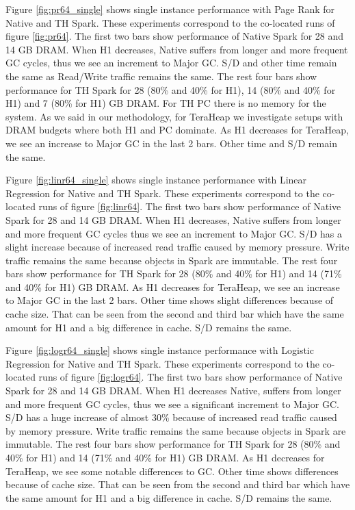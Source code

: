 Figure \ref{fig:pr64_single} shows single instance performance with Page Rank for Native and TH Spark. These experiments correspond to the co-located runs of figure \ref{fig:pr64}. The first two bars show performance of Native Spark for 28 and 14 GB DRAM. When H1 decreases, Native suffers from longer and more frequent GC cycles, thus we see an increment to Major GC. S/D and other time remain the same as Read/Write traffic remains the same. The rest four bars show performance for TH Spark for 28 (80\% and 40\% for H1), 14 (80\% and 40\% for H1) and 7 (80\% for H1) GB DRAM. For TH PC there is no memory for the system. As we said in our methodology, for TeraHeap we investigate setups with DRAM budgets where both H1 and PC dominate. As H1 decreases for TeraHeap, we see an increase to Major GC in the last 2 bars. Other time and S/D remain the same.

Figure \ref{fig:linr64_single} shows single instance performance with Linear Regression for Native and TH Spark. These experiments correspond to the co-located runs of figure \ref{fig:linr64}. The first two bars show performance of Native Spark for 28 and 14 GB DRAM. When H1 decreases, Native suffers from longer and more frequent GC cycles thus we see an increment to Major GC. S/D has a slight increase because of increased read traffic caused by memory pressure. Write traffic remains the same because objects in Spark are immutable. The rest four bars show performance for TH Spark for 28 (80\% and 40\% for H1) and 14 (71\% and 40\% for H1) GB DRAM. As H1 decreases for TeraHeap, we see an increase to Major GC in the last 2 bars. Other time shows slight differences because of cache size. That can be seen from the second and third bar which have the same amount for H1 and a big difference in cache. S/D remains the same.

Figure \ref{fig:logr64_single} shows single instance performance with Logistic Regression for Native and TH Spark. These experiments correspond to the co-located runs of figure \ref{fig:logr64}. The first two bars show performance of Native Spark for 28 and 14 GB DRAM. When H1 decreases Native, suffers from longer and more frequent GC cycles, thus we see a significant increment to Major GC. S/D has a huge increase of almost 30\% because of increased read traffic caused by memory pressure. Write traffic remains the same because objects in Spark are immutable. The rest four bars show performance for TH Spark for 28 (80\% and 40\% for H1) and 14 (71\% and 40\% for H1) GB DRAM. As H1 decreases for TeraHeap, we see some notable differences to GC. Other time shows differences because of cache size. That can be seen from the second and third bar which have the same amount for H1 and a big difference in cache. S/D remains the same.

